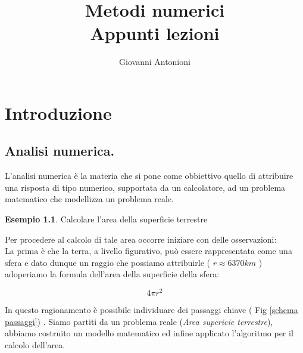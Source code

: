 \documentclass[12pt, a4paper]{book}
\title{
	Metodi numerici \\
	\vspace{1cm}
	Appunti lezioni
}
\date{}
\author{Giovanni Antonioni}
\theoremstyle{definition}
\newtheorem{exmp}{Esempio}[section]
\begin{document}
\maketitle
\tableofcontents
\chapter{Introduzione}

\section{Analisi numerica.}

\begin{flushleft}

L'analisi numerica è la materia che si pone come obbiettivo quello di attribuire una risposta di tipo numerico, supportata da un calcolatore,  ad un problema matematico che modellizza un problema reale.

\begin{exmp}
Calcolare l'area della superficie terrestre
\end{exmp}

Per procedere al calcolo di tale area occorre iniziare con delle osservazioni:\\
La prima è che la terra, a livello figurativo, può essere rappresentata come una sfera e dato dunque un raggio che possiamo attribuirle ( $r \approx 6370 km$ ) adoperiamo la formula dell'area della superficie della sfera:

\[ 
	4\pi r^2 
\]

In questo ragionamento è possibile individuare dei passaggi chiave ( Fig \ref{schema passaggi}) .   Siamo partiti da un problema reale (\emph{Area supericie terrestre}), abbiamo costruito un modello matematico ed infine applicato l'algoritmo per il calcolo dell'area. 

\begin{figure}[h]
	\centering
\end{figure}
\end{flushleft}
\end{document}
